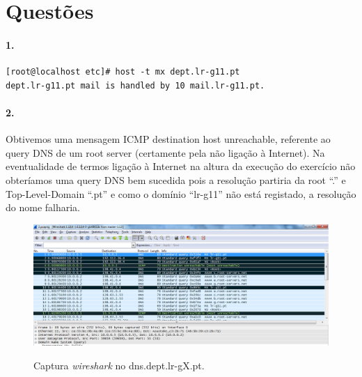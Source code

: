\section*{Questões}
\paragraph{1.}

\begin{verbatim}
[root@localhost etc]# host -t mx dept.lr-g11.pt
dept.lr-g11.pt mail is handled by 10 mail.lr-g11.pt.
\end{verbatim}


\paragraph{2.}
Obtivemos uma mensagem ICMP destination host unreachable, referente ao
query DNS de um root server (certamente pela não ligação à
Internet). Na eventualidade de termos ligação à Internet na altura da
execução do exercício não obteríamos uma query DNS bem sucedida pois a
resolução partiria da root ``.'' e Top-Level-Domain ``.pt'' e como o domínio
``lr-g11'' não está registado, a resolução do nome falharia.

\begin{figure}[h]
\centering
\includegraphics[width=1\textwidth, height=0.33\textheight]{2_cap.png}
\label{fig:2-capturaWireshark}
\caption{Captura \emph{wireshark} no \textsf{dns.dept.lr-gX.pt}.}
\end{figure}











